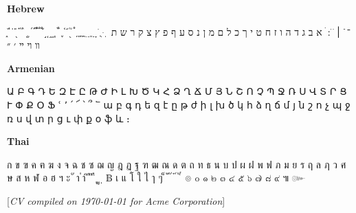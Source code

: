 \documentclass[a4paper,10pt,oneside]{article}
\newcommand{\CVNote}{CV compiled on {\today} for Acme Corporation}
\begin{document}
\begin{body}
\SmallEntryGap
\textbf{Hebrew}
\begin{detail}
֑ ֒ ֓ ֔ ֕ ֖ ֗ ֘ ֙ ֚ ֛ ֜ ֝ ֞ ֟ ֠ ֡ ֣ ֤ ֥ ֦ ֧ ֨ ֩ ֪ ֫ ֬ ֭ ֮ ֯ ְ ֱ ֲ ֳ ִ ֵ ֶ ַ ָ ֹ ֻ ּ ֽ ־ ֿ ׀ ׁ ׂ ׃ ׄ א ב ג ד ה ו ז ח ט י ך כ ל ם מ ן נ ס ע ף פ ץ צ ק ר ש ת װ ױ ײ ׳ ״
\end{detail}

\EntryGap
\textbf{Armenian}
\begin{detail}
\UseSecondaryFont
Ա Բ Գ Դ Ե Զ Է Ը Թ Ժ Ի Լ Խ Ծ Կ Հ Ձ Ղ Ճ Մ Յ Ն Շ Ո Չ Պ Ջ Ռ Ս Վ Տ Ր Ց Ւ Փ Ք Օ Ֆ ՙ ՚ ՛ ՜ ՝ ՞ ՟ ա բ գ դ ե զ է ը թ ժ ի լ խ ծ կ հ ձ ղ ճ մ յ ն շ ո չ պ ջ ռ ս վ տ ր ց ւ փ ք օ ֆ և ։
\end{detail}

\EntryGap
\textbf{Thai}
\begin{detail}
\UseSecondaryFont
ก ข ฃ ค ฅ ฆ ง จ ฉ ช ซ ฌ ญ ฎ ฏ ฐ ฑ ฒ ณ ด ต ถ ท ธ น บ ป ผ ฝ พ ฟ ภ ม ย ร ฤ ล ฦ ว ศ ษ ส ห ฬ อ ฮ ฯ ะ ั า ำ ิ ี ึ ื ุ ู ฺ ฿ เ แ โ ใ ไ ๅ ๆ ็ ่ ้ ๊ ๋ ์ ํ ๎ ๏ ๐ ๑ ๒ ๓ ๔ ๕ ๖ ๗ ๘ ๙ ๚ ๛
\end{detail}

\end{body}


\begin{flushright}
\scriptsize%
[\textit{\CVNote}]%
\hspace{2.0mm}\null
\end{flushright}

\label{LastPage}~
\end{document}
